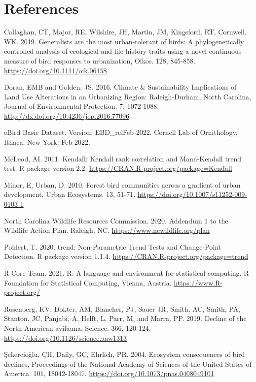 \documentclass[
  12pt,
]{article}
\begin{document}
\newpage

\hypertarget{references}{%
\section{References}\label{references}}

Callaghan, CT, Major, RE, Wilshire, JH, Martin, JM, Kingsford, RT,
Cornwell, WK. 2019. Generalists are the most urban‐tolerant of birds: A
phylogenetically controlled analysis of ecological and life history
traits using a novel continuous measure of bird responses to
urbanization, Oikos. 128, 845-858.
\url{https://doi.org/10.1111/oik.06158}

Doran, EMB and Golden, JS. 2016. Climate \& Sustainability Implications
of Land Use Alterations in an Urbanizing Region: Raleigh-Durham, North
Carolina, Journal of Environmental Protection. 7, 1072-1088.
\url{http://dx.doi.org/10.4236/jep.2016.77096}

eBird Basic Dataset. Version: EBD\_relFeb-2022. Cornell Lab of
Ornithology, Ithaca, New York. Feb 2022.

McLeod, AI. 2011. Kendall: Kendall rank correlation and Mann-Kendall
trend test. R package version 2.2.
\url{https://CRAN.R-project.org/package=Kendall}

Minor, E, Urban, D. 2010. Forest bird communities across a gradient of
urban development, Urban Ecosystems. 13, 51-71.
\url{https://doi.org/10.1007/s11252-009-0103-1}

North Carolina Wildlife Resources Commission. 2020. Addendum 1 to the
Wildlife Action Plan. Raleigh, NC. \url{https://www.ncwildlife.org/plan}

Pohlert, T. 2020. trend: Non-Parametric Trend Tests and Change-Point
Detection. R package version 1.1.4.
\url{https://CRAN.R-project.org/package=trend}

R Core Team. 2021. R: A language and environment for statistical
computing. R Foundation for Statistical Computing, Vienna, Austria.
\url{https://www.R-project.org/}

Rosenberg, KV, Dokter, AM, Blancher, PJ, Sauer JR, Smith, AC, Smith, PA,
Stanton, JC, Panjabi, A, Helft, L, Parr, M, and Marra, PP. 2019. Decline
of the North American avifauna, Science. 366, 120-124.
\url{https://doi.org/10.1126/science.aaw1313}

Şekercioğlu, ÇH, Daily, GC, Ehrlich, PR. 2004. Ecosystem consequences of
bird declines, Proceedings of the National Academy of Sciences of the
United States of America. 101, 18042-18047.
\url{https://doi.org/10.1073/pnas.0408049101}
\end{document}
